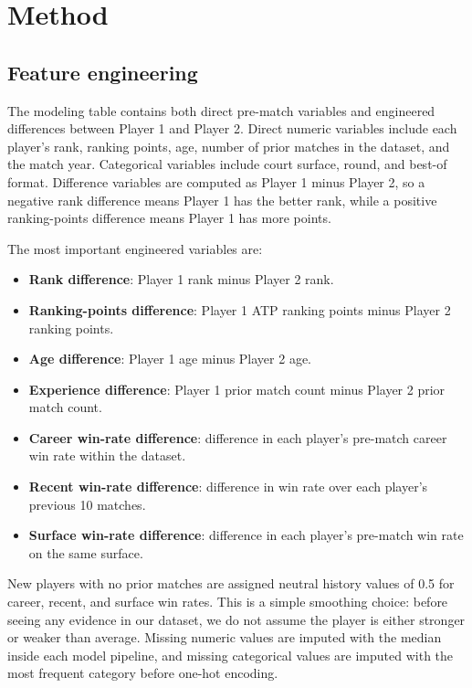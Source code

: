 \documentclass{article}
\begin{document}
\section{Method}
\label{sec:method}

\subsection{Feature engineering}

The modeling table contains both direct pre-match variables and engineered differences between Player 1 and Player 2. Direct numeric variables include each player's rank, ranking points, age, number of prior matches in the dataset, and the match year. Categorical variables include court surface, round, and best-of format. Difference variables are computed as Player 1 minus Player 2, so a negative rank difference means Player 1 has the better rank, while a positive ranking-points difference means Player 1 has more points.

The most important engineered variables are:
\begin{itemize}
  \item \textbf{Rank difference}: Player 1 rank minus Player 2 rank.
  \item \textbf{Ranking-points difference}: Player 1 ATP ranking points minus Player 2 ranking points.
  \item \textbf{Age difference}: Player 1 age minus Player 2 age.
  \item \textbf{Experience difference}: Player 1 prior match count minus Player 2 prior match count.
  \item \textbf{Career win-rate difference}: difference in each player's pre-match career win rate within the dataset.
  \item \textbf{Recent win-rate difference}: difference in win rate over each player's previous 10 matches.
  \item \textbf{Surface win-rate difference}: difference in each player's pre-match win rate on the same surface.
\end{itemize}

New players with no prior matches are assigned neutral history values of 0.5 for career, recent, and surface win rates. This is a simple smoothing choice: before seeing any evidence in our dataset, we do not assume the player is either stronger or weaker than average. Missing numeric values are imputed with the median inside each model pipeline, and missing categorical values are imputed with the most frequent category before one-hot encoding.
\end{document}
